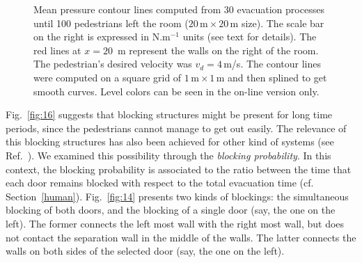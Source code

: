 \begin{figure}[!htbp]
\hfill
{}
\caption{\label{fig:16and17} Mean pressure contour lines computed from 30 
evacuation processes until 100 pedestrians left the room 
($20\,\mathrm{m}\times20\,\mathrm{m}$ size). The scale bar on the right is 
expressed in N.m$^{-1}$ units (see text for details). The red lines at 
$x=20$~m represent the walls on the right of the room. The pedestrian's desired 
velocity was $v_d=4\,$m/s. The contour lines were computed on a square grid of 
$1\,\mathrm{m}\times1\,\mathrm{m}$ and then splined to get smooth curves. Level 
colors can be seen in the on-line version only.} 
\end{figure}


Fig.~\ref{fig:16} suggests that blocking structures might be present for long 
time periods, since the pedestrians cannot manage to get out easily.   The relevance of this blocking structures has also been achieved for other kind of systems (see Ref.~\cite{kunte}). We 
examined this possibility through the \textit{blocking probability}. In this 
context, the blocking probability is associated to the ratio between the time 
that each door remains blocked with respect to the total evacuation time (cf. 
Section~\ref{human}). Fig.~\ref{fig:14} presents two kinds of blockings: the 
simultaneous blocking of both doors, and the blocking of a single door (say, 
the one on the left). The former connects the left most wall with the right 
most wall, but does not contact the separation wall in the middle of the walls. 
The latter connects the walls on both sides of the selected door (say, 
the one on the left). \\


